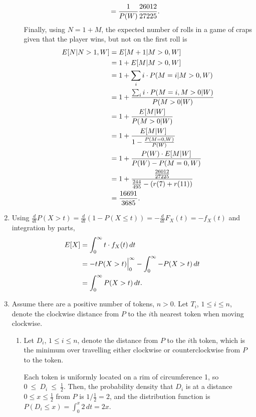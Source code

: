 \documentclass{article}
\begin{document}
\begin{enumerate}
\begin{enumerate}
\[\begin{split}
                & = \frac{1}{P(W)}\frac{26012}{27225}\text.
        \end{split}\]
        Finally, using $N=1+M$, the expected number of rolls in a game of craps given that the player wins,
        but not on the first roll is
        \[\begin{split}
        E[N|N>1,W]  & = E[M+1|M>0,W] \\
                    & = 1 + E[M|M>0,W] \\
                    & = 1 + \sum_i i \cdot P(M=i|M>0,W) \\
                    & = 1 + \frac{\sum_i i \cdot P(M=i,M>0|W)}{P(M>0|W)} \\
                    & = 1 + \frac{E[M|W]}{P(M>0|W)} \\
                    & = 1 + \frac{E[M|W]}{1-\frac{P(M=0,W)}{P(W)}} \\
                    & = 1 + \frac{P(W)\cdot E[M|W]}{P(W) - P(M=0,W)} \\
                    & = 1 + \frac{\frac{26012}{27225}}{\frac{244}{495} - (r(7)+r(11))} \\
                    & = \frac{16691}{3685}\text.
        \end{split}\]
    \end{enumerate}
\item
    Using $\frac{d}{dt}P(X>t) = \frac{d}{dt}(1 - P(X \leq t)) = -\frac{d}{dt}F_X(t) = -f_X(t)$ and integration by parts,
    \[\begin{split}
    E[X] & = \int_0^\infty t\cdot f_X(t)\,dt \\
         & = -tP(X>t)\Big|_0^\infty - \int_0^\infty-P(X>t)\,dt \\
         & = \int_0^\infty P(X>t)\,dt\text.
    \end{split}\]
\item
    Assume there are a positive number of tokens, $n>0$.
    Let $T_i$, $1 \leq i \leq n$, denote the clockwise distance from $P$ to the $i$th nearest token when moving clockwise.
    \begin{enumerate}
    \item
        Let $D_i$, $1 \leq i \leq n$, denote the distance from $P$ to the $i$th token, which is the minimum over travelling either clockwise or counterclockwise from $P$ to the token.

        Each token is uniformly located on a rim of circumference 1, so $0~\leq~D_i~\leq~\frac{1}{2}$.
        Then, the probability density that $D_i$ is at a distance $0 \leq x \leq \frac{1}{2}$ from $P$ is $1/\frac{1}{2}=2$,
        and the distribution function is $P(D_i \leq x) = \int_0^x 2 \,dt = 2x$.


\end{enumerate}
\end{enumerate}
\end{document}
